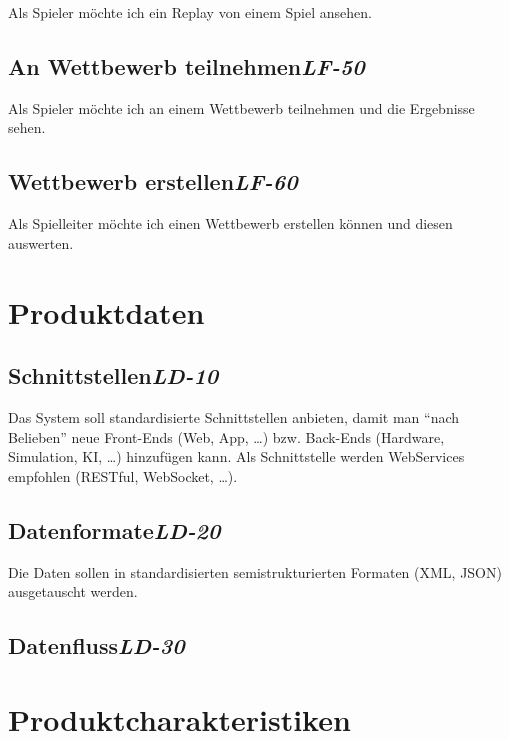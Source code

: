 Als Spieler möchte ich ein Replay von einem Spiel ansehen.

\section[An Wettbewerb teilnehmen]{An Wettbewerb teilnehmen\hfill \emph{LF-50}}

Als Spieler möchte ich an einem Wettbewerb teilnehmen und die Ergebnisse sehen.

\section[Wettbewerb erstellen]{Wettbewerb erstellen\hfill \emph{LF-60}}

Als Spielleiter möchte ich einen Wettbewerb erstellen können und diesen auswerten.



\chapter{Produktdaten}

\section[Schnittstellen]{Schnittstellen\hfill \emph{LD-10}}

Das System soll standardisierte Schnittstellen anbieten, damit man \enquote{nach Belieben} neue Front-Ends (Web, App, \dots) bzw. Back-Ends (Hardware, Simulation, KI, \dots) hinzufügen kann.
Als Schnittstelle werden WebServices empfohlen (RESTful, WebSocket, \dots).


\section[Datenformate]{Datenformate\hfill \emph{LD-20}}

Die Daten sollen in standardisierten semistrukturierten Formaten (XML, JSON) ausgetauscht werden.


\section[Datenfluss]{Datenfluss\hfill \emph{LD-30}}


\chapter{Produktcharakteristiken}

